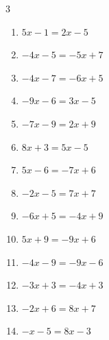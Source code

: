 \begin{multicols}{3}
\begin{enumerate}

  \item $5x-1=2x-5$


  \item $-4x-5=-5x+7$

        \phantom{$\displaystyle x=12$}

  \item $-4x-7=-6x+5$

        \phantom{$\displaystyle x=6$}

  \item $-9x-6=3x-5$


  \item $-7x-9=2x+9$

        \phantom{$\displaystyle x=-2$}

\columnbreak %

  \item $8x+3=5x-5$


  \item $5x-6=-7x+6$

        \phantom{$\displaystyle x=1$}

  \item $-2x-5=7x+7$


  \item $-6x+5=-4x+9$

        \phantom{$\displaystyle x=-2$}

  \item $5x+9=-9x+6$


  \item $-4x-9=-9x-6$


  \item $-3x+3=-4x+3$

        \phantom{$\displaystyle x=0$}

  \item $-2x+6=8x+7$


  \item $-x-5=8x-3$


\end{enumerate}
\end{multicols}

